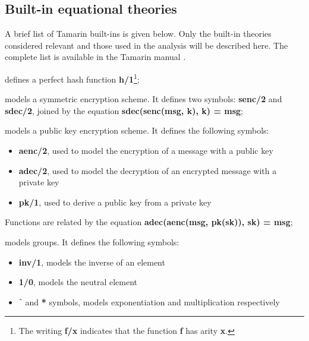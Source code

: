 \subsection{Built-in equational theories}
\label{sub:built-in-equational-theories}
A brief list of Tamarin built-ins is given below. Only the built-in theories considered relevant and those used in the analysis will be described here. The complete list is available in the Tamarin manual \cite{TamarinProverManual}.

\begin{description}[style=nextline]
    \item[hashing] defines a perfect hash function \textbf{h/1}\footnote{The writing \textbf{f/x} indicates that the function \textbf{f} has arity \textbf{x}.};
    \item[symmetric-encryption] models a symmetric encryption scheme. It defines two symbols: \textbf{senc/2} and \textbf{sdec/2}, joined by the equation \textbf{sdec(senc(msg, k), k) = msg};
    \item[asymmetric-encryption] models a public key encryption scheme. It defines the following symbols:

        \begin{itemize}
            \item{\textbf{aenc/2}, used to model the encryption of a message with a public key}
            \item{\textbf{adec/2}, used to model the decryption of an encrypted message with a private key}
            \item{\textbf{pk/1}, used to derive a public key from a private key}
        \end{itemize}

        Functions are related by the equation \textbf{adec(aenc(msg, pk(sk)), sk) = msg};

    \item[diffie-hellman] models \DiHe{} groups. It defines the following symbols:

        \begin{itemize}
            \item{\textbf{inv/1}, models the inverse of an element}
            \item{\textbf{1/0}, models the neutral element}
            \item{\textbf{$\hat{\mkern6mu}$} and \textbf{*} symbols, models exponentiation and multiplication respectively}
        \end{itemize}


\end{description}
